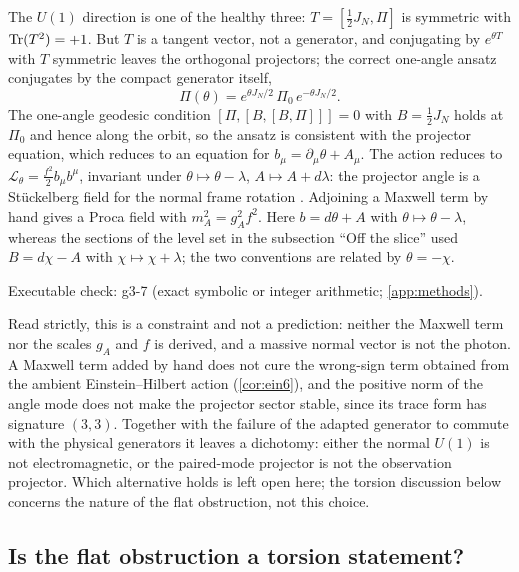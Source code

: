 \begin{example}
\label{ex:stueckelberg}
The $U(1)$ direction is one of the healthy three: $T=[\tfrac12J_N,\Pi]$ is symmetric with $\operatorname{Tr}(T^2)=+1$. But $T$ is a tangent vector, not a generator, and conjugating by
$e^{\theta T}$ with $T$ symmetric leaves the orthogonal projectors; the correct one-angle ansatz conjugates by the compact generator itself,
\[
\Pi(\theta)=e^{\theta J_N/2}\,\Pi_0\,e^{-\theta J_N/2}.
\]
The one-angle geodesic condition $[\Pi,[B,[B,\Pi]]]=0$ with $B=\tfrac12J_N$ holds at $\Pi_0$ and hence along the orbit, so the ansatz is consistent with the
projector equation, which reduces to an equation for $b_\mu=\partial_\mu\theta+A_\mu$. The action reduces to $\mathcal L_\theta=\tfrac{f^2}2b_\mu b^\mu$, invariant under
$\theta\mapsto\theta-\lambda$, $A\mapsto A+d\lambda$: the projector angle is a St\"uckelberg field for the normal frame rotation \cite{RueggRuizAltaba04}. Adjoining a
Maxwell term by hand gives a Proca field with $m_A^2=g_A^2f^2$. Here $b=d\theta+A$ with $\theta\mapsto\theta-\lambda$, whereas the sections of the level set in the subsection ``Off the slice''
used $B=d\chi-A$ with $\chi\mapsto\chi+\lambda$; the two conventions are related by $\theta=-\chi$.
\end{example}

\noindent Executable check: g3-7 (exact symbolic or integer arithmetic; \cref{app:methods}).

Read strictly, this is a constraint and not a prediction: neither the Maxwell term nor the scales $g_A$ and $f$ is derived, and a massive normal vector is not the
photon. A Maxwell term added by hand does not cure the wrong-sign term obtained from the ambient Einstein--Hilbert action (\cref{cor:ein6}), and the positive norm
of the angle mode does not make the projector sector stable, since its trace form has signature $(3,3)$. Together with the failure of the adapted generator to commute with the physical generators it leaves a dichotomy: either the normal $U(1)$ is not
electromagnetic, or the paired-mode projector is not the observation projector. Which alternative holds is left open here; the torsion
discussion below concerns the nature of the flat obstruction, not this choice.

\subsection{Is the flat obstruction a torsion statement?}

